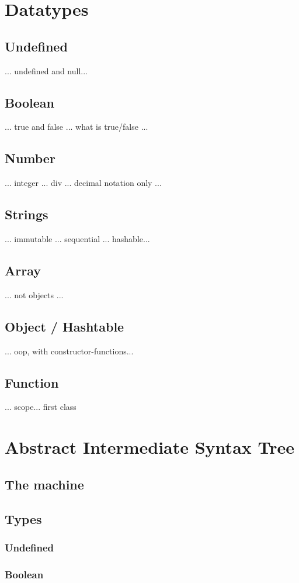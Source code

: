 \section{Datatypes}

\subsection{Undefined}
... undefined and null...
\subsection{Boolean}
... true and false ... what is true/false ... 
\subsection{Number}
... integer ... div ... decimal notation only ...
\subsection{Strings}
... immutable ... sequential ... hashable...
\subsection{Array}
... not objects ...
\subsection{Object / Hashtable}
... oop, with constructor-functions...
\subsection{Function}
... scope... first class

\section{Abstract Intermediate Syntax Tree}
\subsection{The machine}
\subsection{Types}
\subsubsection{Undefined}
\subsubsection{Boolean}
